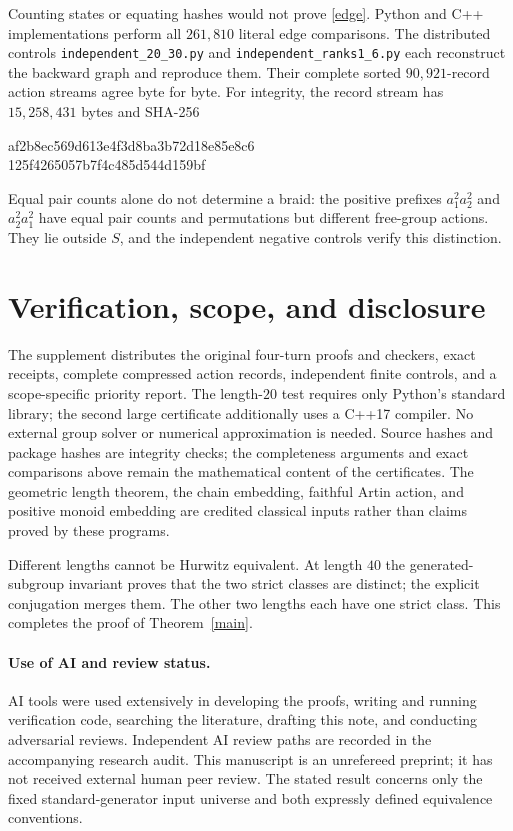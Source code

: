 \documentclass[11pt]{article}
\begin{document}
Counting states or equating hashes would not prove \eqref{edge}.
Python and C++ implementations perform all \(261{,}810\) literal
edge comparisons. The distributed controls
\texttt{independent\_20\_30.py} and
\texttt{independent\_ranks1\_6.py} each reconstruct the backward
graph and reproduce them. Their complete sorted \(90{,}921\)-record action
streams agree byte for byte.
For integrity, the record stream has \(15{,}258{,}431\) bytes and
SHA-256
\begin{center}\small\ttfamily
af2b8ec569d613e4f3d8ba3b72d18e85e8c6\\
125f4265057b7f4c485d544d159bf
\end{center}
Equal pair counts alone do not determine a braid: the positive
prefixes \(a_1^2a_2^2\) and \(a_2^2a_1^2\) have equal pair counts
and permutations but different free-group actions.
They lie outside \(S\), and the independent negative controls
verify this distinction.

\section{Verification, scope, and disclosure}
The supplement distributes the original four-turn proofs and
checkers, exact receipts, complete compressed action records,
independent finite controls, and a scope-specific priority report.
The length-\(20\) test requires only Python's standard library;
the second large certificate additionally uses a C++17 compiler.
No external group solver or numerical approximation is needed.
Source hashes and package hashes are integrity checks;
the completeness arguments and exact comparisons above remain
the mathematical content of the certificates.
The geometric length theorem, the chain embedding, faithful
Artin action, and positive monoid embedding are credited
classical inputs rather than claims proved by these programs.

Different lengths cannot be Hurwitz equivalent.
At length \(40\) the generated-subgroup invariant proves that
the two strict classes are distinct; the explicit conjugation
merges them. The other two lengths each have one strict class.
This completes the proof of Theorem~\ref{main}.

\paragraph{Use of AI and review status.}
AI tools were used extensively in developing the proofs,
writing and running verification code, searching the literature,
drafting this note, and conducting adversarial reviews.
Independent AI review paths are recorded in the accompanying
research audit. This manuscript is an unrefereed preprint;
it has not received external human peer review.
The stated result concerns only the fixed standard-generator
input universe and both expressly defined equivalence conventions.
\end{document}
